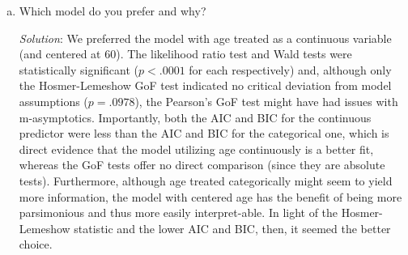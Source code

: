 \documentclass{article}
\begin{document}
\begin{enumerate}[a.]
    \item Which model do you prefer and why?  
    
    \textit{Solution}: We preferred the model with age treated as a continuous variable (and centered at 60). The likelihood ratio test and Wald tests were statistically significant ($p < .0001$ for each respectively) and, although only the Hosmer-Lemeshow GoF test indicated no critical deviation from model assumptions ($p=.0978$), the Pearson's GoF test might have had issues with m-asymptotics. Importantly, both the AIC and BIC for the continuous predictor were less than the AIC and BIC for the categorical one, which is direct evidence that the model utilizing age continuously is a better fit, whereas the GoF tests offer no direct comparison (since they are absolute tests). Furthermore, although age treated categorically might seem to yield more information, the model with centered age has the benefit of being more parsimonious and thus more easily interpret-able. In light of the Hosmer-Lemeshow statistic and the lower AIC and BIC, then, it seemed the better choice.



\end{enumerate}
\end{document}
